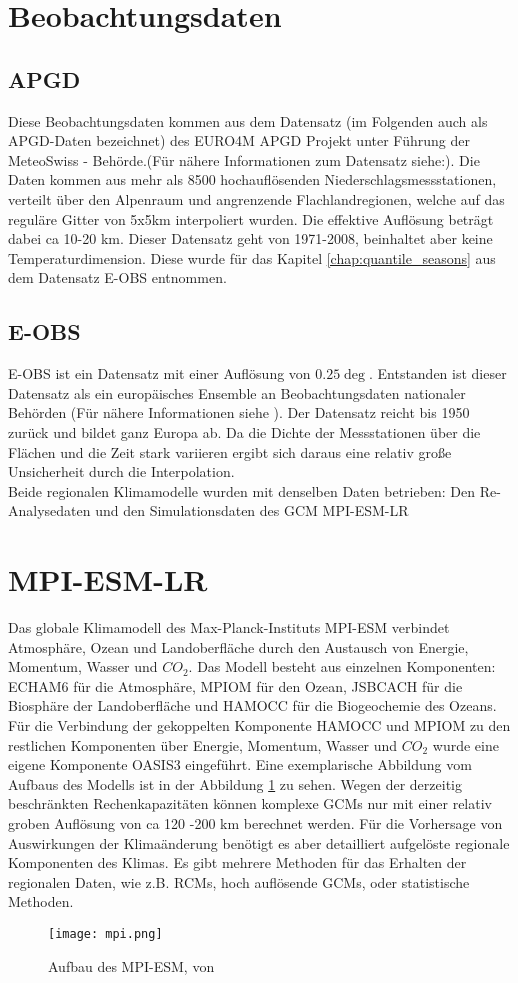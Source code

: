 \section{Beobachtungsdaten}
\subsection{APGD}
Diese Beobachtungsdaten kommen aus dem Datensatz (im Folgenden auch als APGD-Daten bezeichnet) des EURO4M APGD Projekt unter Führung der MeteoSwiss - Behörde\cite{meteoswiss}.(Für nähere Informationen zum Datensatz siehe:\cite{apgd}). Die Daten kommen aus mehr als 8500 hochauflösenden Niederschlagsmessstationen, verteilt über den Alpenraum und angrenzende Flachlandregionen, welche auf das reguläre Gitter von 5x5km interpoliert wurden. Die effektive Auflösung beträgt dabei ca 10-20 km. Dieser Datensatz geht von 1971-2008, beinhaltet aber keine Temperaturdimension. Diese wurde für das Kapitel \ref{chap:quantile_seasons} aus dem Datensatz E-OBS entnommen.
\subsection{E-OBS}
E-OBS ist ein Datensatz mit einer Auflösung von $0.25\deg$. Entstanden ist dieser Datensatz als ein europäisches Ensemble an Beobachtungsdaten nationaler Behörden (Für nähere Informationen siehe \cite{eobs}). Der Datensatz reicht bis 1950 zurück und bildet ganz Europa ab. Da die Dichte der Messstationen über die Flächen und die Zeit stark variieren ergibt sich daraus eine relativ große Unsicherheit durch die Interpolation.\\
Beide regionalen Klimamodelle wurden mit denselben Daten betrieben: Den Re-Analysedaten und den Simulationsdaten des GCM MPI-ESM-LR 
\section{MPI-ESM-LR} \label{sec:MPI}
Das globale Klimamodell des Max-Planck-Instituts MPI-ESM verbindet Atmosphäre, Ozean und Landoberfläche durch den Austausch von Energie, Momentum, Wasser und $CO_{2}$. Das Modell besteht aus einzelnen Komponenten: ECHAM6 für die Atmosphäre, MPIOM für den Ozean, JSBCACH für die Biosphäre der Landoberfläche und HAMOCC für die Biogeochemie des Ozeans. Für die Verbindung der gekoppelten Komponente HAMOCC und MPIOM zu den restlichen Komponenten über Energie, Momentum, Wasser und $CO_2$ wurde eine eigene Komponente OASIS3 eingeführt. Eine exemplarische Abbildung vom Aufbaus des Modells ist in der Abbildung \ref{fig:mpi-esm} zu sehen. Wegen der derzeitig beschränkten Rechenkapazitäten können komplexe GCMs nur mit einer relativ groben Auflösung von ca 120 -200 km berechnet werden. Für die Vorhersage von Auswirkungen der Klimaänderung benötigt es aber detailliert aufgelöste regionale Komponenten des Klimas. Es gibt mehrere Methoden für das Erhalten der regionalen Daten, wie z.B. RCMs, hoch auflösende GCMs, oder statistische Methoden.
\begin{figure}[h]
	\centering
	\texttt{[image: mpi.png]}
	\caption{Aufbau des MPI-ESM, von \cite{mpi-esm-lr}}
	\label{fig:mpi-esm}
\end{figure}
